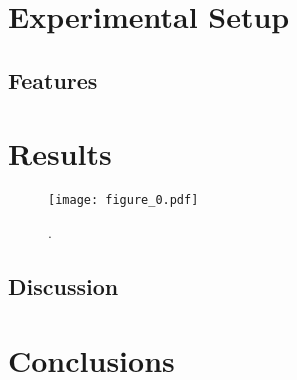 \documentclass{article}
\begin{document}
	\section{Experimental Setup}

	\subsection{Features}



	\section{Results}


		\begin{figure}[h]
			\begin{center}
				\texttt{[image: figure\_0.pdf]}
				\caption{.}
			\end{center}
		\end{figure}

	\subsection{Discussion}



	\section{Conclusions}


	\clearpage
\end{document}
